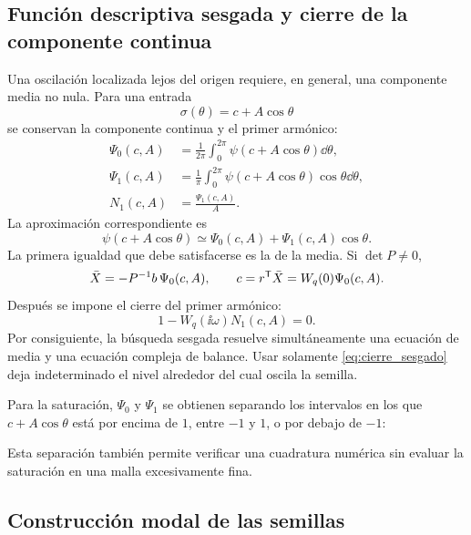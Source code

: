 \subsection{Función descriptiva sesgada y cierre de la componente continua}

Una oscilación localizada lejos del origen requiere, en general, una componente
media no nula. Para una entrada
\[
\sigma(\theta)=c+A\cos\theta
\]
se conservan la componente continua y el primer armónico:
\begin{equation}
\begin{aligned}
\Psi_0(c,A)
&=\frac{1}{2\pi}\int_0^{2\pi}
\psi(c+A\cos\theta)\dd\theta,\\
\Psi_1(c,A)
&=\frac{1}{\pi}\int_0^{2\pi}
\psi(c+A\cos\theta)\cos\theta\dd\theta,\\
N_1(c,A)&=\frac{\Psi_1(c,A)}{A}.
\end{aligned}
\label{eq:df_sesgada}
\end{equation}
La aproximación correspondiente es
\[
\psi(c+A\cos\theta)
\simeq\Psi_0(c,A)+\Psi_1(c,A)\cos\theta.
\]
La primera igualdad que debe satisfacerse es la de la media. Si
\(\det P\neq0\),
\begin{equation}
\bar X=-P^{-1}b\,\Psi_0(c,A),\qquad
c=r^{\mathsf T}\bar X=W_q(0)\Psi_0(c,A).
\label{eq:cierre_dc_sesgado}
\end{equation}
Después se impone el cierre del primer armónico:
\begin{equation}
1-W_q(\ii\omega)N_1(c,A)=0.
\label{eq:cierre_sesgado}
\end{equation}
Por consiguiente, la búsqueda sesgada resuelve simultáneamente una ecuación de
media y una ecuación compleja de balance. Usar solamente
\cref{eq:cierre_sesgado} deja indeterminado el nivel alrededor del cual
oscila la semilla.

Para la saturación, \(\Psi_0\) y \(\Psi_1\) se obtienen separando los
intervalos en los que \(c+A\cos\theta\) está por encima de \(1\), entre
\(-1\) y \(1\), o por debajo de \(-1\):
\begingroup
\def\HAFOderivationpart{7}

\endgroup
Esta separación también permite verificar una cuadratura numérica sin evaluar
la saturación en una malla excesivamente fina.

\subsection{Construcción modal de las semillas}

